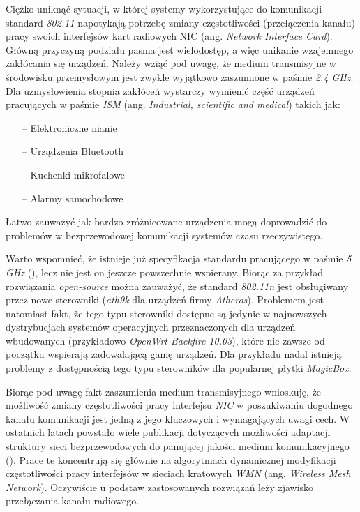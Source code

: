%

Ciężko uniknąć sytuacji, w której systemy wykorzystujące do komunikacji standard \emph{802.11} napotykają potrzebę zmiany częstotliwości (przełączenia kanału) pracy swoich interfejsów kart radiowych NIC (ang. \emph{Network Interface Card}). Główną przyczyną podziału pasma jest wielodostęp, a więc unikanie wzajemnego zakłócania się urządzeń. Należy wziąć pod uwagę, że medium transmisyjne w środowisku przemysłowym jest zwykle wyjątkowo zaszumione w paśmie \emph{2.4 GHz}. Dla uzmysłowienia stopnia zakłóceń wystarczy wymienić część urządzeń pracujących w paśmie \emph{ISM} (ang. \emph{Industrial, scientific and medical}) takich jak:
\begin{itemize}
\item[--] Elektroniczne nianie
\item[--] Urządzenia Bluetooth
\item[--] Kuchenki mikrofalowe
\item[--] Alarmy samochodowe
\end{itemize}
Łatwo zauważyć jak bardzo zróżnicowane urządzenia mogą doprowadzić do problemów w bezprzewodowej komunikacji systemów czasu rzeczywistego.

Warto wspomnieć, że istnieje już specyfikacja standardu pracującego w paśmie \emph{5 GHz} (\cite{std:IEEE80211n}), lecz nie jest on jeszcze powszechnie wspierany. Biorąc za przykład rozwiązania \emph{open-source} można zauważyć, że standard \emph{802.11n} jest obsługiwany przez nowe sterowniki (\emph{ath9k} dla urządzeń firmy \emph{Atheros}). Problemem jest natomiast fakt, że tego typu sterowniki dostępne są jedynie w najnowszych dystrybucjach systemów operacyjnych przeznaczonych dla urządzeń wbudowanych (przykładowo \emph{OpenWrt Backfire 10.03}), które nie zawsze od początku wspierają zadowalającą gamę urządzeń. Dla przykładu nadal istnieją problemy z dostępnością tego typu sterowników dla popularnej płytki \emph{MagicBox}.

Biorąc pod uwagę fakt zaszumienia medium transmisyjnego wnioskuję, że możliwość zmiany częstotliwości pracy interfejsu \emph{NIC} w poszukiwaniu dogodnego kanału komunikacji jest jedną z jego kluczowych i wymagających uwagi cech. W ostatnich latach powstało wiele publikacji dotyczących możliwości adaptacji struktury sieci bezprzewodowych do panującej jakości medium komunikacyjnego (\cite{pub:DCS}). Prace te koncentrują się głównie na algorytmach dynamicznej modyfikacji częstotliwości pracy interfejsów w sieciach kratowych \emph{WMN} (ang. \emph{Wireless Mesh Network}). Oczywiście u podstaw zastosowanych rozwiązań leży zjawisko przełączania kanału radiowego.

